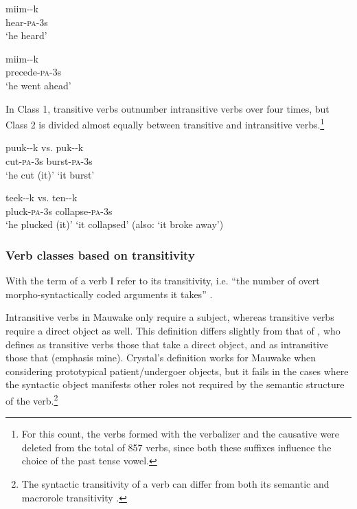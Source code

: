 \ea%
\label{ex:3:x253}
\gll miim--k \\
hear-\textsc{pa}-3s \\
\glt`he heard'
\z

\ea%
\label{ex:3:x254}
\gll miim--k \\
precede-\textsc{pa}-3s \\
\glt`he went ahead'
\z

In Class 1, transitive verbs outnumber intransitive verbs over four times, but Class 2 is divided almost equally between transitive and intransitive verbs.\footnote{For this count, the verbs formed with the verbalizer  and the causative  were deleted from the total of 857 verbs, since both these suffixes influence the choice of the past tense vowel.}

\ea%
\label{ex:3:x255}
\gll puuk--k vs. puk--k \\
cut-\textsc{pa}-3s {} burst-\textsc{pa}-3s \\
\glt`he cut (it)' {} `it burst' 
%
%
\z

\ea%
\label{ex:3:x256}
\gll teek--k vs. ten--k \\
pluck-\textsc{pa}-3s {} collapse-\textsc{pa}-3s\\
\glt`he plucked (it)' {} `it collapsed' (also: `it broke away')
%
%
\z

\subsubsection{Verb classes based on transitivity}\label{sec:3.8.4.2}
{}
With the term  of a verb I refer to its  transitivity, i.e. ``{the number of overt morpho-syntactically coded arguments it takes}'' \citep[147]{VanValinEtAl1997}. 

Intransitive verbs in Mauwake only require a subject, whereas transitive verbs require a direct object as well. This definition differs slightly from that of \citet[397]{Crystal1997}, who defines as transitive verbs those that  take a direct object, and as intransitive those that  (emphasis mine). Crystal's definition works for Mauwake when considering prototypical patient/undergoer objects, but it fails in the cases where the syntactic object manifests other roles not required by the semantic structure of the verb.\footnote{The syntactic transitivity of a verb can differ from both its semantic and macrorole transitivity \citep{VanValinEtAl1997}.} 


